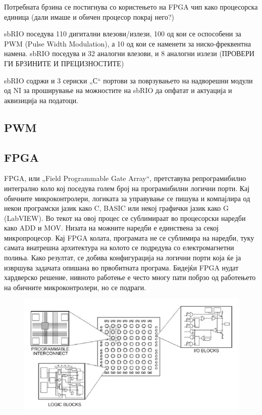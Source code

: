 \documentclass{article}
\begin{document}
Потребната брзина се постигнува со користењето на FPGA чип како процесорска единица (дали имаше и обичен процесор покрај него?)

sbRIO поседува 110 дигитални влезови/излези, 100 од кои се оспособени за PWM (Pulse Width Modulation), а 10 од кои се наменети за ниско-фреквентна намена. sbRIO поседува и 32 аналогни влезови, и 8 аналогни излези (ПРОВЕРИ ГИ БРЗИНИТЕ И ПРЕЦИЗНОСТИТЕ)

sbRIO содржи и 3 сериски „С“ портови за поврзувањето на надворешни модули од NI за проширување на можностите на sbRIO да опфатат и актуација и аквизиција на податоци.
\subsection{PWM}

\subsection{FPGA}
FPGA, или „Field Programmable Gate Array“, претставува репрограмибилно интегрално коло кој поседува голем број на програмибилни логични порти. Кај обичните микроконтролери, логиката за управување се пишува и компајлира од некои програмски јазик како C, BASIC или некој графички јазик како G (LabVIEW). Во текот на овој процес се сублимираат во процесорски наредби како ADD и MOV. Низата на можните наредби е единствена за секој микропроцесор. Кај FPGA колата, програмата не се сублимира на наредби, туку самата внатрешна архитектура на колото се подредува со електромагнетни полиња. Како резултат, се добива конфигурација на логични порти која ќе ја извршува задачата опишана во првобитната програма. Бидејќи FPGA нудат хардверско решение, нивното работење е често многу пати побрзо од работењето на обичните микроконтролери, но се подраги.  

\begin{figure}[h]
\includegraphics[width=0.75\linewidth]{fpga_diagram.jpg}
\centering
\end{figure}
\end{document}
